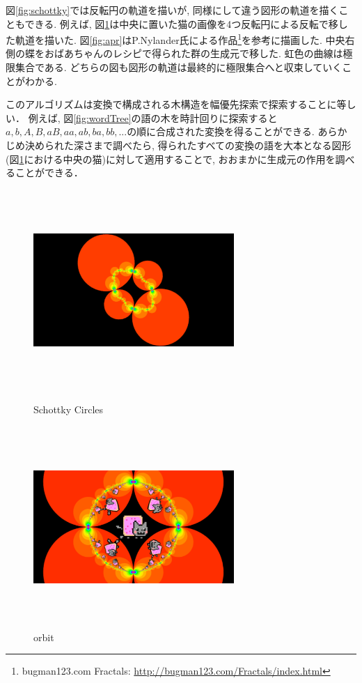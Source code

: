 図\ref{fig:schottky}では反転円の軌道を描いが, 同様にして違う図形の軌道を描くこともできる.
例えば, 図\ref{fig:orbit}は中央に置いた猫の画像を4つ反転円による反転で移した軌道を描いた.
図\ref{fig:apr}はP.Nylander氏による作品\footnote{bugman123.com Fractals: \url{http://bugman123.com/Fractals/index.html}}を参考に描画した.
中央右側の蝶をおばあちゃんのレシピで得られた群の生成元で移した.
虹色の曲線は極限集合である.
どちらの図も図形の軌道は最終的に極限集合へと収束していくことがわかる.

このアルゴリズムは変換で構成される木構造を幅優先探索で探索することに等しい．
例えば, 図\ref{fig:wordTree}の語の木を時計回りに探索すると$ a, b, A, B, aB, aa, ab, ba, bb, ...$の順に合成された変換を得ることができる.
あらかじめ決められた深さまで調べたら, 得られたすべての変換の語を大本となる図形(図\ref{fig:orbit}における中央の猫)に対して適用することで, おおまかに生成元の作用を調べることができる．


\begin{figure}[htbp]
 \begin{minipage}{0.49\hsize}
  \begin{center}
   \includegraphics[width=3in, height=3in, keepaspectratio]{../img/klein/schottkyCircles.pdf}
   \caption{Schottky Circles}
   \label{fig:schottky}
  \end{center}
 \end{minipage}
 \begin{minipage}{0.49\hsize}
  \begin{center}
   \includegraphics[width=3in, height=3in, keepaspectratio]{../img/klein/circleOrbit.pdf}
   \caption{orbit}
   \label{fig:orbit}
  \end{center}
 \end{minipage}
\end{figure}


